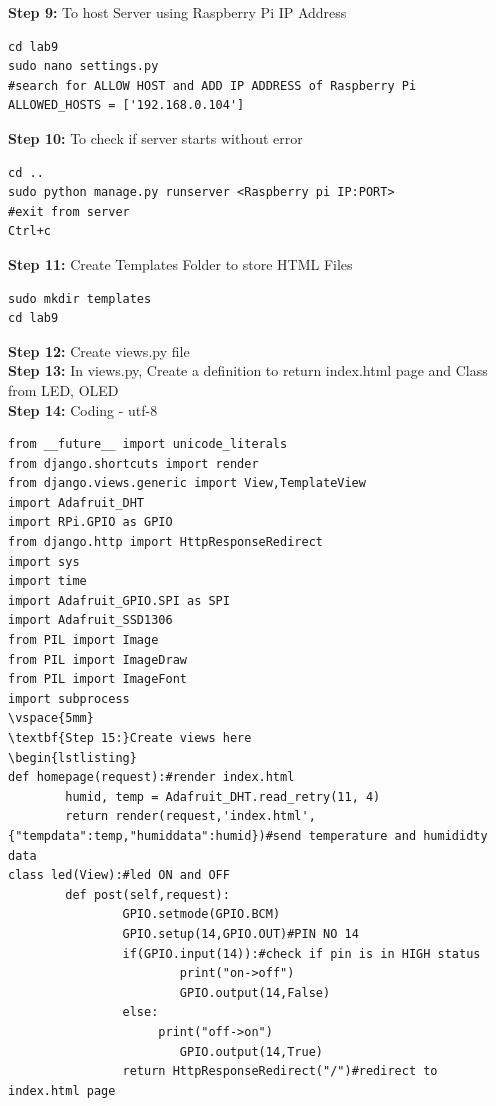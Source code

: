 \documentclass[12pt,a4paper]{article}
\begin{document}
\begin{flushleft}
\textbf{Step 9:} To host Server using Raspberry Pi IP Address
\begin{lstlisting}
cd lab9
sudo nano settings.py
#search for ALLOW HOST and ADD IP ADDRESS of Raspberry Pi
ALLOWED_HOSTS = ['192.168.0.104']
\end{lstlisting}
\vspace{5mm}

\textbf{Step 10:} To check if server starts without error
\begin{lstlisting}
cd ..
sudo python manage.py runserver <Raspberry pi IP:PORT>
#exit from server
Ctrl+c
\end{lstlisting}
\vspace{5mm}

\textbf{Step 11:} Create Templates Folder to store HTML Files
\begin{lstlisting}
sudo mkdir templates
cd lab9
\end{lstlisting}
\vspace{5mm}

\textbf{Step 12:} Create views.py file \\
\vspace{5mm}
\textbf{Step 13:} In views.py, Create a definition to return index.html page and Class from LED, OLED \\
\vspace{5mm}
\textbf{Step 14:} Coding - utf-8 \\
\begin{lstlisting}
from __future__ import unicode_literals
from django.shortcuts import render
from django.views.generic import View,TemplateView
import Adafruit_DHT
import RPi.GPIO as GPIO
from django.http import HttpResponseRedirect
import sys
import time
import Adafruit_GPIO.SPI as SPI
import Adafruit_SSD1306
from PIL import Image
from PIL import ImageDraw
from PIL import ImageFont
import subprocess
\vspace{5mm}
\textbf{Step 15:}Create views here
\begin{lstlisting}
def homepage(request):#render index.html
        humid, temp = Adafruit_DHT.read_retry(11, 4)
        return render(request,'index.html',{"tempdata":temp,"humiddata":humid})#send temperature and humididty data
class led(View):#led ON and OFF
        def post(self,request):
                GPIO.setmode(GPIO.BCM)
                GPIO.setup(14,GPIO.OUT)#PIN NO 14
                if(GPIO.input(14)):#check if pin is in HIGH status
                        print("on->off")
                        GPIO.output(14,False)
                else:
                     print("off->on")
                        GPIO.output(14,True)
                return HttpResponseRedirect("/")#redirect to index.html page


\end{lstlisting}
\end{flushleft}
\end{document}
